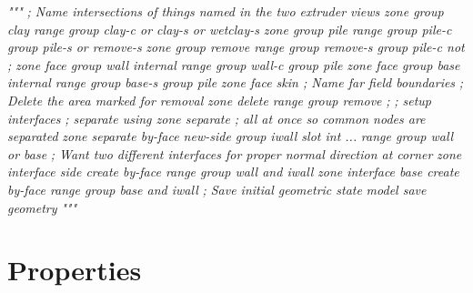 \documentclass[a4paper, nobind]{templates/ociamthesis}
\newenvironment{Shaded}{\begin{snugshade}}{\end{snugshade}}
\newcommand{\CommentTok}[1]{\textcolor[rgb]{0.56,0.35,0.01}{\textit{#1}}}
\renewenvironment{Shaded}
{
  \vspace{10pt}%
  \begin{snugshade}%
}{%
  \end{snugshade}%
  \vspace{8pt}%
}
\begin{document}
\begin{Shaded}
\begin{Highlighting}[]
\CommentTok{"""}
\CommentTok{; Name intersections of things named in the two extruder views}
\CommentTok{zone group \textquotesingle{}clay\textquotesingle{} range group \textquotesingle{}clay{-}c\textquotesingle{} or \textquotesingle{}clay{-}s\textquotesingle{} or \textquotesingle{}wetclay{-}s\textquotesingle{}}
\CommentTok{zone group \textquotesingle{}pile\textquotesingle{} range group \textquotesingle{}pile{-}c\textquotesingle{} group \textquotesingle{}pile{-}s\textquotesingle{} or \textquotesingle{}remove{-}s\textquotesingle{}}
\CommentTok{zone group \textquotesingle{}remove\textquotesingle{} range group \textquotesingle{}remove{-}s\textquotesingle{} group \textquotesingle{}pile{-}c\textquotesingle{} not ; }
\CommentTok{zone face group \textquotesingle{}wall\textquotesingle{} internal range group \textquotesingle{}wall{-}c\textquotesingle{} group \textquotesingle{}pile\textquotesingle{}}
\CommentTok{zone face group \textquotesingle{}base\textquotesingle{} internal range group \textquotesingle{}base{-}s\textquotesingle{} group \textquotesingle{}pile\textquotesingle{}}
\CommentTok{zone face skin ; Name far field boundaries}
\CommentTok{; Delete the area marked for removal}
\CommentTok{zone delete range group \textquotesingle{}remove\textquotesingle{}}
\CommentTok{;}
\CommentTok{; setup interfaces}
\CommentTok{; separate using zone separate}
\CommentTok{; all at once so common nodes are separated}
\CommentTok{zone separate by{-}face new{-}side group \textquotesingle{}iwall\textquotesingle{} slot \textquotesingle{}int\textquotesingle{} ...}
\CommentTok{     range group \textquotesingle{}wall\textquotesingle{} or \textquotesingle{}base\textquotesingle{}}
\CommentTok{; Want two different interfaces for proper normal direction at corner}
\CommentTok{zone interface \textquotesingle{}side\textquotesingle{} create by{-}face range group \textquotesingle{}wall\textquotesingle{} and \textquotesingle{}iwall\textquotesingle{}}
\CommentTok{zone interface \textquotesingle{}base\textquotesingle{} create by{-}face range group \textquotesingle{}base\textquotesingle{} and \textquotesingle{}iwall\textquotesingle{}}
\CommentTok{; Save initial geometric state}
\CommentTok{model save \textquotesingle{}geometry\textquotesingle{}}
\CommentTok{"""}
\end{Highlighting}
\end{Shaded}

\hypertarget{properties-1}{%
\section{Properties}\label{properties-1}}
\end{document}
